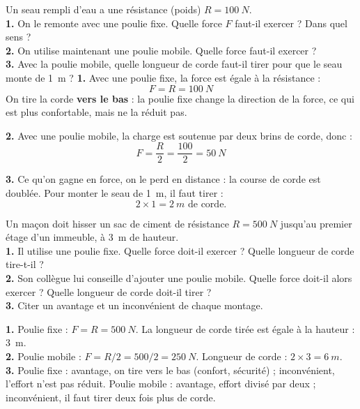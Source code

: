 \documentclass[11pt]{article}
\begin{document}
\begin{exoresolu}
Un seau rempli d'eau a une résistance (poids) $R = \SI{100}{N}$.\\
\textbf{1.} On le remonte avec une poulie fixe. Quelle force $F$ faut-il exercer ? Dans quel sens ?\\
\textbf{2.} On utilise maintenant une poulie mobile. Quelle force faut-il exercer ?\\
\textbf{3.} Avec la poulie mobile, quelle longueur de corde faut-il tirer pour que le seau monte de \SI{1}{m} ?
\tcblower
\textbf{1.} Avec une poulie fixe, la force est égale à la résistance :
\[ F = R = \SI{100}{N} \]
On tire la corde \textbf{vers le bas} : la poulie fixe change la direction de la force, ce qui est plus confortable, mais ne la réduit pas.

\textbf{2.} Avec une poulie mobile, la charge est soutenue par deux brins de corde, donc :
\[ F = \dfrac{R}{2} = \dfrac{100}{2} = \SI{50}{N} \]

\textbf{3.} Ce qu'on gagne en force, on le perd en distance : la course de corde est doublée. Pour monter le seau de \SI{1}{m}, il faut tirer :
\[ 2 \times 1 = \SI{2}{m} \text{ de corde.} \]
\end{exoresolu}

\begin{exercice}
Un maçon doit hisser un sac de ciment de résistance $R = \SI{500}{N}$ jusqu'au premier étage d'un immeuble, à \SI{3}{m} de hauteur.\\
\textbf{1.} Il utilise une poulie fixe. Quelle force doit-il exercer ? Quelle longueur de corde tire-t-il ?\\
\textbf{2.} Son collègue lui conseille d'ajouter une poulie mobile. Quelle force doit-il alors exercer ? Quelle longueur de corde doit-il tirer ?\\
\textbf{3.} Citer un avantage et un inconvénient de chaque montage.
\end{exercice}

\begin{corrige}
\textbf{1.} Poulie fixe : $F = R = \SI{500}{N}$. La longueur de corde tirée est égale à la hauteur : \SI{3}{m}.\\
\textbf{2.} Poulie mobile : $F = R/2 = 500/2 = \SI{250}{N}$. Longueur de corde : $2 \times 3 = \SI{6}{m}$.\\
\textbf{3.} Poulie fixe : avantage, on tire vers le bas (confort, sécurité) ; inconvénient, l'effort n'est pas réduit. Poulie mobile : avantage, effort divisé par deux ; inconvénient, il faut tirer deux fois plus de corde.
\end{corrige}
\end{document}
